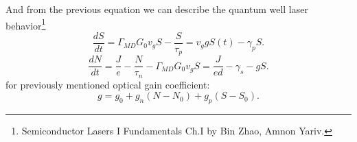 And from the previous equation we can describe the quantum well laser behavior\footnote{
    Semiconductor
Lasers I
Fundamentals Ch.I by Bin Zhao, Amnon Yariv.
}
\begin{equation}
	\frac{d S}{d t} = \Gamma_{MD} G_0 v_g S - \frac{S}{\tau_p} = v_g g S(t) - \gamma_p S. 
\end{equation}
\begin{equation}
	\frac{d N}{d t} = \frac{J}{e} - \frac{N}{\tau_n} - \Gamma_{MD} G_0 v_g S = \frac{J}{e d} - \gamma_s - g S.
\end{equation}
for previously mentioned optical gain coefficient:
\begin{equation}
	g = g_0 + g_n(N-N_0) + g_p(S - S_0).
\end{equation}